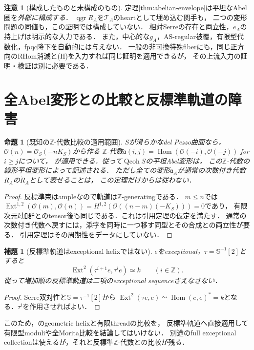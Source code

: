 \documentclass[11pt,a4paper]{ltjsarticle}
\newtheorem{proposition}[theorem]{命題}
\newtheorem{lemma}[theorem]{補題}
\theoremstyle{definition}
\newtheorem{remark}[theorem]{注意}
\newcommand{\OO}{\mathcal O}
\newcommand{\TT}{\mathcal T}
\newcommand{\Hom}{\operatorname{Hom}}
\newcommand{\Ext}{\operatorname{Ext}}
\newcommand{\qgr}{\operatorname{qgr}}
\newcommand{\SSer}{\mathbb S}
\begin{document}
\begin{remark}[構成したものと未構成のもの]\label{rem:scope}
定理\ref{thm:abelian-envelope}は平坦なAbel圏を\emph{外部に構成する}．
$\qgr R_A$を$\TT_A$のheartとして埋め込む関手も，
二つの変形問題の同値も，この証明では構成していない．
相対Serreの存在と両立性，$e_A$の持上げは明示的な入力である．
また，中心的な$g_A$，AS-regular被覆，有限型代数化，fpqc降下を自動的には与えない．
一般の非可換特殊fiberにも，同じ正方向のRHom消滅と\textup{(H)}を入力すれば同じ証明を適用できるが，
その上流入力の証明・検証は別に必要である．
\end{remark}

\section{全Abel変形との比較と反標準軌道の障害}\label{sec:periodicity}
\begin{proposition}[既知の$\mathbb Z$-代数比較の適用範囲]\label{prop:z-deformation}
$S$が滑らかなdel Pezzo曲面なら，$\OO(n)=\OO_S(-nK_S)$から作る
$\mathbb Z$-代数$\mathfrak a(i,j)=\Hom(\OO(-i),\OO(-j))$ for $i\geq j$について，
\cite[Theorem 4.5]{DDL}が適用できる．従って$\operatorname{Qcoh}S$の平坦Abel変形は，
この$\mathbb Z$-代数の線形平坦変形によって記述される．
ただし全ての変形$\mathfrak a_A$が通常の次数付き代数$R_A$の$\check R_A$として表せることは，
この定理だけからは従わない．
\end{proposition}
\begin{proof}
反標準束はampleなので軌道は$\mathbb Z$-generatingである．
$m\leq n$では$\Ext^{1,2}(\OO(m),\OO(n))=H^{1,2}(\OO((n-m)(-K_S)))=0$であり，
有限次元$k$加群とのtensor後も同じである．これは引用定理の仮定を満たす．
通常の次数付き代数へ戻すには，添字を同時に一つ移す同型とその合成との両立性が要る．
引用定理はその周期性をデータにしていない．
\end{proof}

\begin{lemma}[反標準軌道はexceptional helixではない]\label{lem:not-helix}
$e$をexceptional，$\tau=\SSer^{-1}[2]$とすると
\[
 \Ext^2(\tau^{i+1}e,\tau^ie)\simeq k\qquad(i\in\mathbb Z).
\]
従って増加順の反標準軌道は二項のexceptional sequenceさえなさない．
\end{lemma}
\begin{proof}
Serre双対性と$\SSer=\tau^{-1}[2]$から
$\Ext^2(\tau e,e)\simeq\Hom(e,e)^*=k$となる．$\tau^i$を作用させればよい．
\end{proof}
このため，\cite[Theorem 5.15]{DDL}のgeometric helixと有限threadの比較を，
反標準軌道へ直接適用して有限型moduliや全Morita比較を結論してはいけない．
別途のfull exceptional collectionは使えるが，それと反標準$\mathbb Z$-代数との比較が残る．
\end{document}
